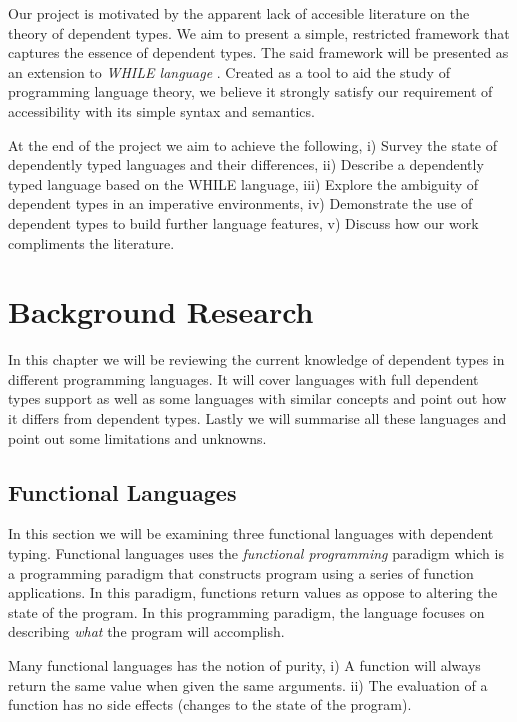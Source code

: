 \documentclass[a4paper,12pt]{report}
\begin{document}
\par
Our project is motivated by the apparent lack of accesible literature on the 
theory of dependent types. We aim to present a simple, restricted framework that 
captures the essence of dependent types. The said framework will be presented as 
an extension to \textit{WHILE language} \cite{whileLanguage}. Created as a tool 
to aid the study of programming language theory, we believe it strongly satisfy our 
requirement of accessibility with its simple syntax and semantics. 

\par
At the end of the project we aim to achieve the following, i) Survey the state 
of dependently typed languages and their differences, ii) Describe a dependently 
typed language based on the WHILE language, iii) Explore the ambiguity of 
dependent types in an imperative environments, iv) Demonstrate the use of 
dependent types to build further language features, v) Discuss how our work 
compliments the literature. 


\chapter{Background Research} 
In this chapter we will be reviewing the current knowledge of dependent types 
in different programming languages. It will cover languages with full dependent 
types support as well as some languages with similar concepts and point out how 
it differs from dependent types. Lastly we will summarise all these languages 
and point out some limitations and unknowns. 

\section{Functional Languages}

In this section we will be examining three functional languages with 
dependent typing. Functional languages 
uses the \textit{functional programming} \cite{overviewFP} paradigm which is a programming 
paradigm that constructs program using a series of function applications. In 
this paradigm, functions return values as oppose to altering the state of the 
program. In this programming paradigm, the language focuses on describing 
\textit{what} the program will accomplish.

\par

Many functional languages has the notion of purity, i) A function will always 
return the same value when given the same arguments. ii) The evaluation of a 
function has no side effects (changes to the state of the program).
\end{document}
